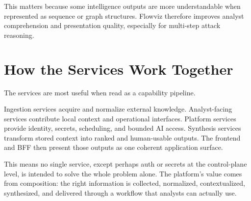 This matters because some intelligence outputs are more understandable when represented as sequence or graph structures. Flowviz therefore improves analyst comprehension and presentation quality, especially for multi-step attack reasoning.

\section{How the Services Work Together}
The services are most useful when read as a capability pipeline.

Ingestion services acquire and normalize external knowledge. Analyst-facing services contribute local context and operational interfaces. Platform services provide identity, secrets, scheduling, and bounded AI access. Synthesis services transform stored context into ranked and human-usable outputs. The frontend and BFF then present those outputs as one coherent application surface.

This means no single service, except perhaps auth or secrets at the control-plane level, is intended to solve the whole problem alone. The platform's value comes from composition: the right information is collected, normalized, contextualized, synthesized, and delivered through a workflow that analysts can actually use.

